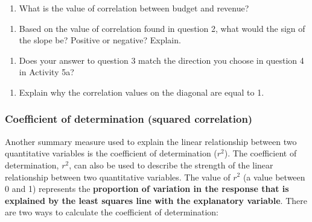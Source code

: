 \documentclass[
]{report}
\providecommand{\tightlist}{%
  \setlength{\itemsep}{0pt}\setlength{\parskip}{0pt}}
\begin{document}
\vspace{0.5in}

\begin{enumerate}
\def\labelenumi{\arabic{enumi}.}
\setcounter{enumi}{1}
\tightlist
\item
  What is the value of correlation between budget and revenue?
\end{enumerate}

\vspace{0.3in}

\begin{enumerate}
\def\labelenumi{\arabic{enumi}.}
\setcounter{enumi}{2}
\tightlist
\item
  Based on the value of correlation found in question 2, what would the sign of the slope be? Positive or negative? Explain.
\end{enumerate}

\vspace{0.5in}

\begin{enumerate}
\def\labelenumi{\arabic{enumi}.}
\setcounter{enumi}{3}
\tightlist
\item
  Does your answer to question 3 match the direction you choose in question 4 in Activity 5a?
\end{enumerate}

\vspace{0.3in}

\begin{enumerate}
\def\labelenumi{\arabic{enumi}.}
\setcounter{enumi}{4}
\tightlist
\item
  Explain why the correlation values on the diagonal are equal to 1.
\end{enumerate}

\vspace{0.8in}

\hypertarget{coefficient-of-determination-squared-correlation}{%
\subsubsection*{Coefficient of determination (squared correlation)}\label{coefficient-of-determination-squared-correlation}}

Another summary measure used to explain the linear relationship between two quantitative variables is the coefficient of determination (\(r^2\)). The coefficient of determination, \(r^2\), can also be used to describe the strength of the linear relationship between two quantitative variables. The value of \(r^2\) (a value between 0 and 1) represents the \textbf{proportion of variation in the response that is explained by the least squares line with the explanatory variable}. There are two ways to calculate the coefficient of determination:
\end{document}
